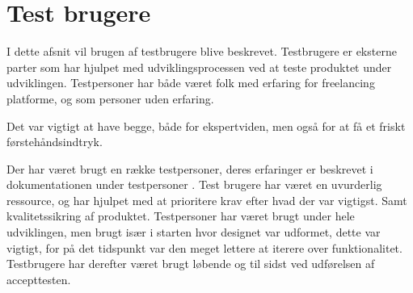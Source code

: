 \chapter{Test brugere}

I dette afsnit vil brugen af testbrugere blive beskrevet. Testbrugere er eksterne parter som har hjulpet med udviklingsprocessen ved at teste produktet under udviklingen. Testpersoner har både været folk med erfaring for freelancing platforme, og som personer uden erfaring.

Det var vigtigt at have begge, både for ekspertviden, men også for at få et friskt førstehåndsindtryk.

Der har været brugt en række testpersoner, deres erfaringer er beskrevet i dokumentationen under testpersoner \cite{test-users}. Test brugere har været en uvurderlig ressource, og har hjulpet med at prioritere krav efter hvad der var vigtigst. Samt kvalitetssikring af produktet. Testpersoner har været brugt under hele udviklingen, men brugt især i starten hvor designet var udformet, dette var vigtigt, for på det tidspunkt var den meget lettere at iterere over funktionalitet. Testbrugere har derefter været brugt løbende og til sidst ved udførelsen af accepttesten.